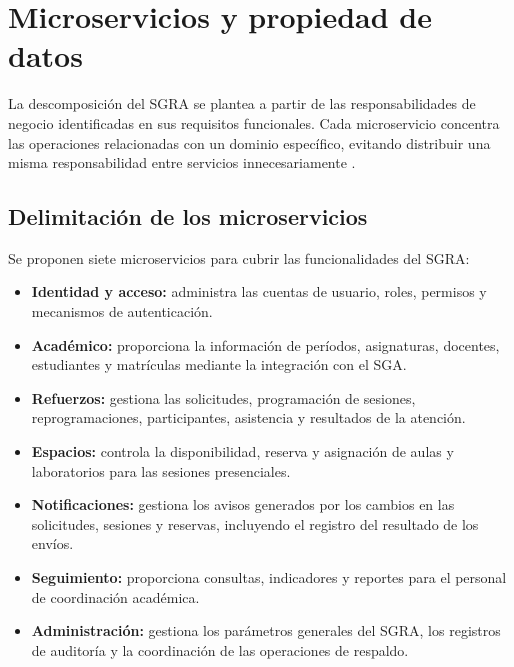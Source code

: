 \section{Microservicios y propiedad de datos}

La descomposición del SGRA se plantea a partir de las
responsabilidades de negocio identificadas en sus requisitos
funcionales. Cada microservicio concentra las operaciones
relacionadas con un dominio específico, evitando distribuir
una misma responsabilidad entre servicios innecesariamente
\cite{microsoft-domain-analysis}.

\subsection{Delimitación de los microservicios}

Se proponen siete microservicios para cubrir las
funcionalidades del SGRA:

\begin{itemize}

    \item \textbf{Identidad y acceso:} administra las
    cuentas de usuario, roles, permisos y mecanismos
    de autenticación.

    \item \textbf{Académico:} proporciona la información
    de períodos, asignaturas, docentes, estudiantes y
    matrículas mediante la integración con el SGA.

    \item \textbf{Refuerzos:} gestiona las solicitudes,
    programación de sesiones, reprogramaciones,
    participantes, asistencia y resultados de la atención.

    \item \textbf{Espacios:} controla la disponibilidad,
    reserva y asignación de aulas y laboratorios para
    las sesiones presenciales.

    \item \textbf{Notificaciones:} gestiona los avisos
    generados por los cambios en las solicitudes,
    sesiones y reservas, incluyendo el registro del
    resultado de los envíos.

    \item \textbf{Seguimiento:} proporciona consultas,
    indicadores y reportes para el personal de
    coordinación académica.

    \item \textbf{Administración:} gestiona los parámetros
    generales del SGRA, los registros de auditoría y
    la coordinación de las operaciones de respaldo.

\end{itemize}

